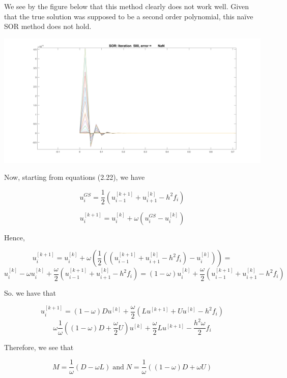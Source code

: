 \begin{solution}
    We see by the figure below that this method clearly does not work well. Given that the true solution
    was supposed to be a second order polynomial, this na\"ive SOR method does not hold.

    \begin{center}
        \includegraphics[scale=0.15]{badsor.PNG}
    \end{center}

    Now, starting from equations (2.22), we have

    $$u^{GS}_i=\frac12(u^{[k+1]}_{i-1}+u^{[k]}_{i+1}-h^2f_i)$$

    $$u^{[k+1]}_i=u^{[k]}_i+\omega(u^{GS}_i-u^{[k]}_i)$$

    Hence,

    $$u^{[k+1]}_i=u^{[k]}_i+\omega(\frac12((u^{[k+1]}_{i-1}+u^{[k]}_{i+1}-h^2f_i)-u^{[k]}_i))=$$
    $$u^{[k]}_i-\omega u^{[k]}_i+\frac{\omega}{2}(u^{[k+1]}_{i-1}+u^{[k]}_{i+1}-h^2f_i)=
    (1-\omega)u^{[k]}_i+\frac{\omega}{2}(u^{[k+1]}_{i-1}+u^{[k]}_{i+1}-h^2f_i)$$

    So. we have that

    $$u^{[k+1]}_i=(1-\omega)Du^{[k]}+\frac{\omega}{2}(Lu^{[k+1]}+Uu^{[k]}-h^2f_i)$$
    $$\omega\frac{1}{\omega}((1-\omega)D+\frac{\omega}{2}U)u^{[k]}+\frac{\omega}{2}Lu^{[k+1]}
    -\frac{h^2\omega}{2}f_i$$
    
    Therefore, we see that

    $$M=\frac{1}{\omega}(D-\omega L)\;\text{and}\;N=\frac{1}{\omega}((1-\omega)D+\omega U)$$

\end{solution}
